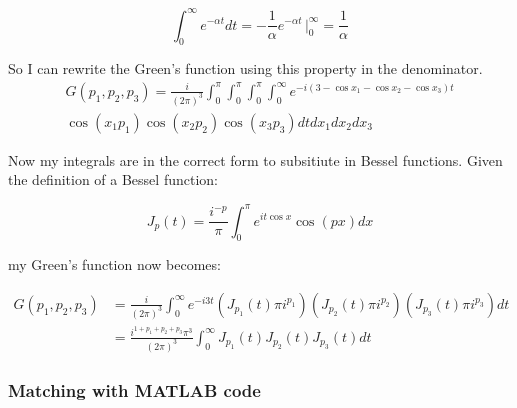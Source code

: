 \documentclass[12pt]{article}
\begin{document}
\begin{equation} 
\int_0^\infty e^{- \alpha t} dt = - \frac{1}{\alpha} e^{- \alpha t }  \, \Big  |_0 ^\infty = \frac{1}{\alpha}
\end{equation}

So I can rewrite the Green's function using this property in the denominator.
\begin{multline}
G(p_1, p_2, p_3) = \frac{i}{(2 \pi )^3} \int_0^\pi \int_0^\pi \int_0^\pi \int_0^\infty e^{- i(3  - \cos x_1 -  \cos x_2 - \cos x_3)t} \\  \cos(x_1 p_1) \cos(x_2 p_2) \cos(x_3 p_3) dt dx_1 dx_2 dx_3 
\end{multline}

Now my integrals are in the correct form to subsitiute in Bessel functions. Given the definition of a Bessel function:

\begin{equation}
J_p(t) = \frac{i^{-p}}{\pi} \int_0^\pi e^{i t \cos x} \cos(p x) dx
\end{equation}

my Green's function now becomes: 

\begin{equation}
\begin{split}
G(p_1, p_2, p_3) &= \frac{i}{(2 \pi )^3} \int_0^\infty e^{-i3t} (J_{p_1}(t) \pi i^{p_1}) (J_{p_2}(t) \pi i^{p_2}) (J_{p_3}(t) \pi i^{p_3})  dt \\
&= \frac{i^{1 + p_1 + p_2 + p_3}\pi ^3}{(2 \pi )^3} \int_0^\infty J_{p_1}(t) J_{p_2}(t) J_{p_3}(t) dt
\end{split}
\end{equation}

\subsubsection{Matching with MATLAB code}


\end{document}
